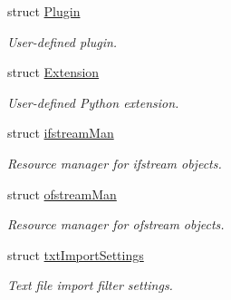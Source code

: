 \begin{DoxyCompactItemize}
struct \hyperlink{structstf_1_1Plugin}{Plugin}
\begin{DoxyCompactList}\small\item\em User-\/defined plugin. \item\end{DoxyCompactList}\item 
struct \hyperlink{structstf_1_1Extension}{Extension}
\begin{DoxyCompactList}\small\item\em User-\/defined Python extension. \item\end{DoxyCompactList}\item 
struct \hyperlink{structstf_1_1ifstreamMan}{ifstreamMan}
\begin{DoxyCompactList}\small\item\em Resource manager for ifstream objects. \item\end{DoxyCompactList}\item 
struct \hyperlink{structstf_1_1ofstreamMan}{ofstreamMan}
\begin{DoxyCompactList}\small\item\em Resource manager for ofstream objects. \item\end{DoxyCompactList}\item 
struct \hyperlink{structstf_1_1txtImportSettings}{txtImportSettings}
\begin{DoxyCompactList}\small\item\em Text file import filter settings. \item\end{DoxyCompactList}\end{DoxyCompactItemize}
